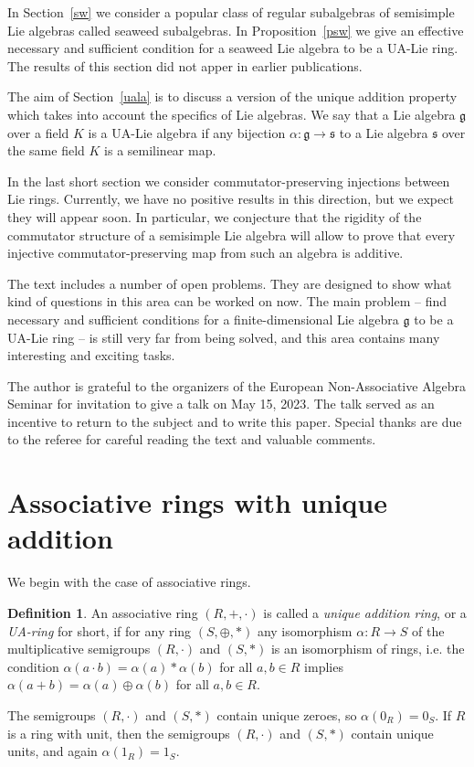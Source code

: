 \documentclass[a4paper,draft,reqno,12pt]{amsart}
\theoremstyle{definition}
\newtheorem{definition}{Definition}
\theoremstyle{remark}
\def\ggg{\mathfrak{g}}
\def\sss{\mathfrak{s}}
\begin{document}
In Section~\ref{sw} we consider a popular class of regular subalgebras of semisimple Lie algebras called seaweed subalgebras. In Proposition~\ref{psw} we give an effective necessary and sufficient condition for a seaweed Lie algebra to be a UA-Lie ring. The results of this section did not apper in earlier publications. 

The aim of Section~\ref{uala} is to discuss a version of the unique addition property which takes into account the specifics of Lie algebras. We say that a Lie algebra $\ggg$ over a field $K$  
is a UA-Lie algebra if any bijection $\alpha\colon\ggg\to\sss$ to a Lie algebra $\sss$ over the same field $K$ is a semilinear map. 

In the last short section we consider commutator-preserving injections between Lie rings. Currently, we have no positive results in this direction, but we expect they will appear soon. In particular, we conjecture that the rigidity of the commutator structure of a semisimple Lie algebra will allow to prove that every injective commutator-preserving map from such an algebra is additive.

The text includes a number of open problems. They are designed to show what kind of questions in this area can be worked on now. The main problem -- find necessary and sufficient conditions for a finite-dimensional Lie algebra $\ggg$ to be a UA-Lie ring -- is still very far from being solved, and this area contains many interesting and exciting tasks.

\smallskip

The author is grateful to the organizers of the European Non-Associative Algebra Seminar for invitation to give a talk on May 15, 2023. The talk served as an incentive to return to the subject and to write this paper. 
Special thanks are due to the referee for careful reading the text and valuable comments.

\section{Associative rings with unique addition}
\label{rua}

We begin with the case of associative rings. 

\begin{definition}
\label{dd}
An associative ring $(R,+,\cdot)$ is called a {\it unique addition ring}, or a {\it UA-ring} for short, if for any ring $(S,\oplus,*)$ any isomorphism $\alpha\colon R\to S$ of the multiplicative semigroups $(R,\cdot)$ and $(S,*)$ is an isomorphism of rings, i.e. the condition $\alpha(a\cdot b)=\alpha(a)*\alpha(b)$ for all $a,b\in R$ implies $\alpha(a+b)=\alpha(a)\oplus\alpha(b)$ for all $a,b\in R$. 
\end{definition} 
%
The semigroups $(R,\cdot)$ and $(S,*)$ contain unique zeroes, so $\alpha(0_R)=0_S$. If $R$ is a ring with unit, then the semigroups $(R,\cdot)$ and $(S,*)$ contain unique units, and again $\alpha(1_R)=1_S$. 
\end{document}
